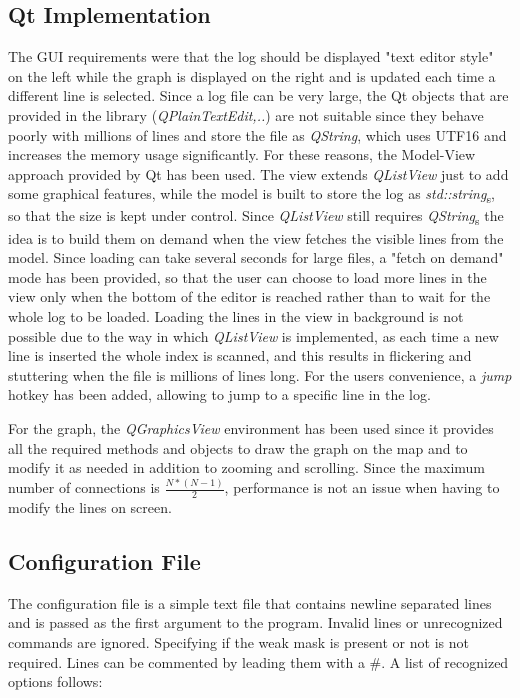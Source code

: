 \subsection{Qt Implementation}
The GUI requirements were that the log should be displayed "text editor style" on the left while the graph is displayed on the right and is updated each time a different line is selected. Since a log file can be very large, the Qt objects that are provided in the library (\textit{QPlainTextEdit,..}) are not suitable since they behave poorly with millions of lines and store the file as \textit{QString}, which uses UTF16 and increases the memory usage significantly. For these reasons, the Model-View approach provided by Qt has been used. The view extends \textit{QListView} just to add some graphical features, while the model is built to store the log as \textit{std::string}\textsubscript{s}, so that the size is kept under control. Since \textit{QListView} still requires \textit{QString}\textsubscript{s} the idea is to build them on demand when the view fetches the visible lines from the model.
Since loading can take several seconds for large files, a "fetch on demand" mode has been provided, so that the user can choose to load more lines in the view only when the bottom of the editor is reached rather than to wait for the whole log to be loaded. Loading the lines in the view in background is not possible due to the way in which \textit{QListView} is implemented, as each time a new line is inserted the whole index is scanned, and this results in flickering and stuttering when the file is millions of lines long. For the users convenience, a \textit{jump} hotkey has been added, allowing to jump to a specific line in the log.

For the graph, the \textit{QGraphicsView} environment has been used since it provides all the required methods and objects to draw the graph on the map and to modify it as needed in addition to zooming and scrolling. Since the maximum number of connections is $\frac{N*(N-1)}{2}$, performance is not an issue when having to modify the lines on screen.

\subsection{Configuration File}
The configuration file is a simple text file that contains newline separated lines and is passed as the first argument to the program. Invalid lines or unrecognized commands are ignored. Specifying if the weak mask is present or not is not required. Lines can be commented by leading them with a \#. A list of recognized options follows:

